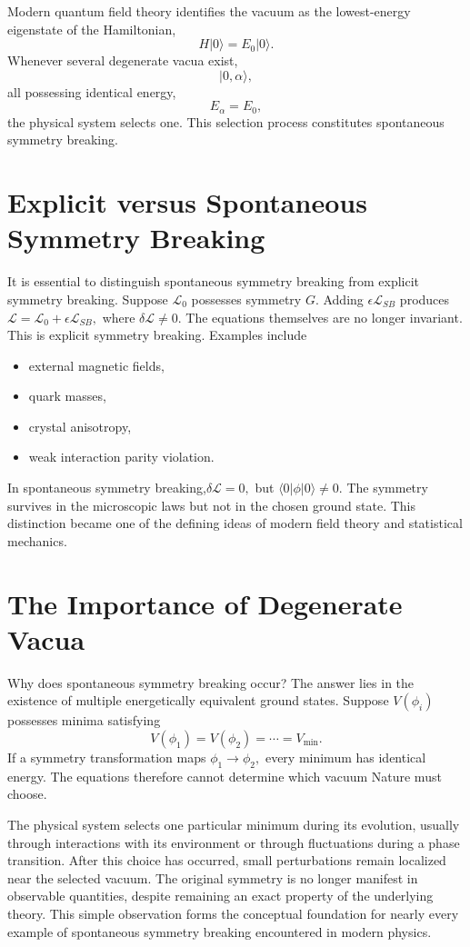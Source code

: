 Modern quantum field theory identifies the vacuum as the lowest-energy
eigenstate of the Hamiltonian,
\[H|0\rangle=E_0|0\rangle.\]
Whenever several degenerate vacua exist,
\[|0,\alpha\rangle,\]
all possessing identical energy,
\[E_\alpha=E_0,\]
the physical system selects one.
This selection process constitutes spontaneous symmetry breaking.

\section{Explicit versus Spontaneous Symmetry Breaking}
It is essential to distinguish spontaneous symmetry breaking from
explicit symmetry breaking.
Suppose  $\mathcal L_0$ possesses symmetry $G.$
Adding $\epsilon\mathcal L_{SB}$ produces 
$\mathcal L=\mathcal L_0+\epsilon\mathcal L_{SB},$
where $\delta\mathcal L\neq0.$
The equations themselves are no longer invariant.
This is explicit symmetry breaking.
Examples include
\begin{itemize}
\item external magnetic fields,
\item quark masses,
\item crystal anisotropy,
\item weak interaction parity violation.
\end{itemize}

In spontaneous symmetry breaking,$\delta\mathcal L=0,$ but
$\langle 0|\phi|0 \rangle \neq0.$
The symmetry survives in the microscopic laws but not in the chosen
ground state.
This distinction became one of the defining ideas of modern field theory
and statistical mechanics.

\section{The Importance of Degenerate Vacua}
Why does spontaneous symmetry breaking occur?
The answer lies in the existence of multiple energetically equivalent
ground states.
Suppose $ V(\phi_i)$ possesses minima satisfying
\[V(\phi_1)=V(\phi_2)=\cdots =V_{\min}.\]
If a symmetry transformation maps
$\phi_1 \rightarrow \phi_2,$ every minimum has identical energy.
The equations therefore cannot determine which vacuum Nature must choose.

The physical system selects one particular minimum during its evolution,
usually through interactions with its environment or through fluctuations
during a phase transition.
After this choice has occurred, small perturbations remain localized near
the selected vacuum.
The original symmetry is no longer manifest in observable quantities,
despite remaining an exact property of the underlying theory.
This simple observation forms the conceptual foundation for nearly every
example of spontaneous symmetry breaking encountered in modern physics.

